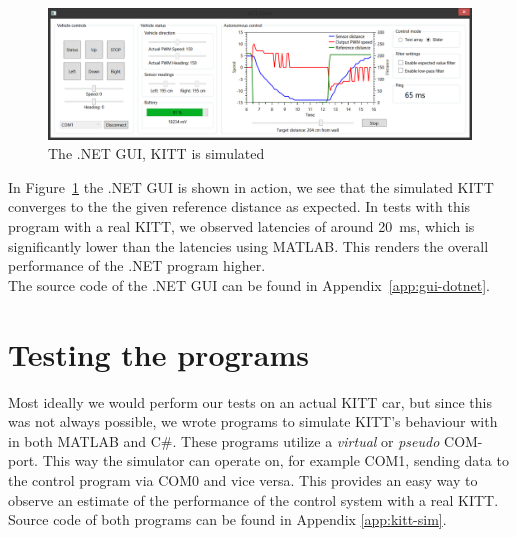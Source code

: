 \documentclass[11pt,titlepage]{report}
\begin{document}
\begin{figure}[H]
	\centering
	\includegraphics[width=\linewidth]{resource/gui-dotnet.png}
	\caption{The .NET GUI, KITT is simulated}
	\label{fig:int-gui-dotnet}
\end{figure}

In Figure~\ref{fig:int-gui-dotnet} the .NET GUI is shown in action, we see that the simulated KITT converges to the the given reference distance as expected. In tests with this program with a real KITT, we observed latencies of around \SI{20}{ms}, which is significantly lower than the latencies using MATLAB. This renders the overall performance of the .NET program higher.
\\
The source code of the .NET GUI can be found in Appendix~\ref{app:gui-dotnet}.

\section{Testing the programs}
Most ideally we would perform our tests on an actual KITT car, but since this was not always possible, we wrote programs to simulate KITT's behaviour with in both MATLAB and C#. These programs utilize a \textit{virtual} or \textit{pseudo} COM-port. This way the simulator can operate on, for example COM1, sending data to the control program via COM0 and vice versa. This provides an easy way to observe an estimate of the performance of the control system with a real KITT.
\\
Source code of both programs can be found in Appendix \ref{app:kitt-sim}.
\end{document}
